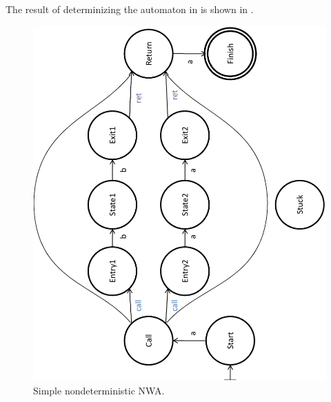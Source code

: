 

The result of determinizing the automaton in  is shown in
.

\begin{figure}[p]
  \centering
    \includegraphics[width=12cm]{Figures/Figure16}
  \caption{Simple nondeterministic NWA.}
  \label{Fi:Det1}
\end{figure}


